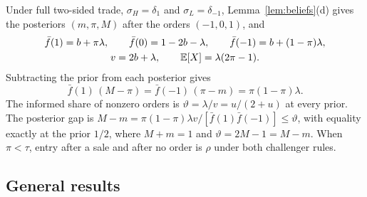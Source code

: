 Under full two-sided trade, \(\sigma_H=\delta_1\) and \(\sigma_L=\delta_{-1}\), Lemma~\ref{lem:beliefs}(d) gives
the posteriors \((m,\pi,M)\) after the orders \((-1,0,1)\), and
\begin{equation}\label{eq:a8-full}
\begin{gathered}
\bar f(1)=b+\pi\lambda,\qquad \bar f(0)=1-2b-\lambda,\qquad \bar f(-1)=b+(1-\pi)\lambda,\\
v=2b+\lambda,\qquad \mathbb{E}[X]=\lambda(2\pi-1).
\end{gathered}
\end{equation}
Subtracting the prior from each posterior gives
\begin{equation}\label{eq:a8-balance}
\bar f(1)\,(M-\pi)=\bar f(-1)\,(\pi-m)=\pi(1-\pi)\lambda .
\end{equation}
The informed share of nonzero orders is \(\vartheta=\lambda/v=u/(2+u)\) at every prior. The posterior gap is
\(M-m=\pi(1-\pi)\lambda v/[\bar f(1)\bar f(-1)]\le\vartheta\), with equality exactly at the prior \(1/2\), where \(M+m=1\)
and \(\vartheta=2M-1=M-m\). When \(\pi<\tau\), entry after a sale and after no order is \(\rho\) under both challenger
rules.

\subsection*{General results}

